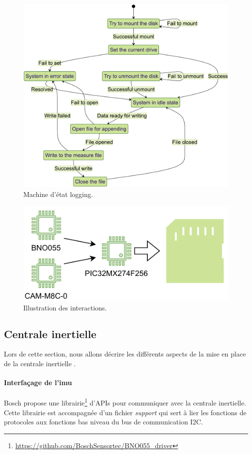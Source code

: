 \begin{figure}[h]
	\centering
	\includegraphics[width=.85\linewidth]{../figures/code/diagrammes/sd-card-logging}
	\caption{Machine d'état logging.}
	\label{fig:sd-card-logging}
\end{figure}

\begin{figure}[h]
	\centering
	\includegraphics[width=0.46\linewidth]{../figures/code/Illustration-SD-per}
	\caption{Illustration des interactions.}
	\label{fig:illustration-sd-per}
\end{figure}

\clearpage

\subsection{Centrale inertielle}
Lors de cette section, nous allons décrire les différents aspects de la mise en place de la centrale inertielle .

\paragraph*{Interfaçage de l'\gls{imu}}
Bosch propose une librairie\footnote{\href{https://github.com/BoschSensortec/BNO055_driver}{https://github.com/BoschSensortec/BNO055\_driver}} d'APIs pour communiquer avec la centrale inertielle. Cette librairie est accompagnée d'un fichier \textit{support} qui sert à lier les fonctions de protocoles aux fonctions bas niveau du bus de communication I2C.



